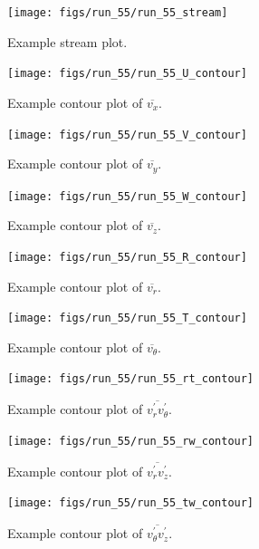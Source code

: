 {\begin{figure}[H]
	\centering
	\texttt{[image: figs/run\_55/run\_55\_stream]}
	\caption{Example stream plot.}
	\label{fig:examp_stream}
\end{figure}

\begin{figure}[H]
	\centering
	\texttt{[image: figs/run\_55/run\_55\_U\_contour]}
\caption{Example contour plot of $\overline{v_x}$.}
\label{fig:examp_U}
\end{figure}

\begin{figure}[H]
	\centering
	\texttt{[image: figs/run\_55/run\_55\_V\_contour]}
\caption{Example contour plot of $\overline{v_y}$.}
\label{fig:examp_V}
\end{figure}

\begin{figure}[H]
	\centering
	\texttt{[image: figs/run\_55/run\_55\_W\_contour]}
\caption{Example contour plot of $\overline{v_z}$.}
\label{fig:examp_W}
\end{figure}

\begin{figure}[H]
	\centering
	\texttt{[image: figs/run\_55/run\_55\_R\_contour]}
\caption{Example contour plot of $\overline{v_r}$.}
\label{fig:examp_R}
\end{figure}

\begin{figure}[H]
	\centering
	\texttt{[image: figs/run\_55/run\_55\_T\_contour]}
\caption{Example contour plot of $\overline{v_\theta}$.}
\label{fig:examp_T}
\end{figure}

\begin{figure}[H]
	\centering
	\texttt{[image: figs/run\_55/run\_55\_rt\_contour]}
\caption{Example contour plot of $\overline{v_r^\prime v_\theta^\prime}$.}
\label{fig:examp_rt}
\end{figure}

\begin{figure}[H]
	\centering
	\texttt{[image: figs/run\_55/run\_55\_rw\_contour]}
\caption{Example contour plot of $\overline{v_r^\prime v_z^\prime}$.}
\label{fig:examp_rw}
\end{figure}

\begin{figure}[H]
	\centering
	\texttt{[image: figs/run\_55/run\_55\_tw\_contour]}
\caption{Example contour plot of $\overline{v_\theta^\prime v_z^\prime}$.}
\label{fig:examp_tw}
\end{figure}

}
